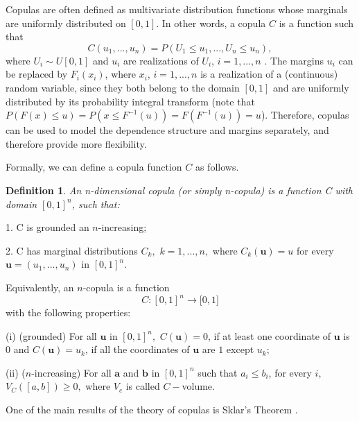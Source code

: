\documentclass[a4paper,12pt]{report}
\newtheorem{definition}{Definition}
\begin{document}
\begin{refsection}
Copulas are often defined as multivariate distribution functions whose
marginals are uniformly distributed on $[0,1]$. In other words, a copula $C$
is a function such that
\begin{equation}
C\left( u_{1},...,u_{n}\right) =P\left( U_{1}\leq u_{1},...,U_{n}\leq
u_{n}\right) ,  \label{20}
\end{equation}%
where $U_{i}\sim U[0,1]$ and $u_{i}$ are realizations of $U_{i}$, $i=1,...,n$%
. The margins $u_{i}$ can be replaced by $F_{i}\left( x_{i}\right) $, where $%
x_{i}$, $i=1,...,n$ is a realization of a (continuous) random variable,
since they both belong to the domain $[0,1]$ and are uniformly distributed
by its probability integral transform (note that $P\left( F\left( x\right)
\leq u\right) =P\left( x\leq F^{-1}\left( u\right) \right) =F\left(
F^{-1}\left( u\right) \right) =u$). Therefore, copulas can be used to model
the dependence structure and margins separately, and therefore provide more
flexibility.

\bigskip

Formally, we can define a copula function $C$ as follows. \bigskip

\begin{definition}
	An n-dimensional copula (or simply n-copula) is a function C with domain $%
	[0,1]^{n}$, such that:
\end{definition}

1. C is grounded an $n$-increasing;

2. C has marginal distributions $C_{k},$ $k=1,...,n,$ where $C_{k}(\mathbf{u}%
)=u$ for every $\mathbf{u}=\left( u_{1},...,u_{n}\right) $ in $[0,1]^{n}.$

\bigskip

Equivalently, an $n$-copula is a function
\begin{equation*}
C:[0,1]^{n}\rightarrow \lbrack 0,1]
\end{equation*}%
with the following properties:

(i) (grounded) For all $\mathbf{u}$ in $[0,1]^{n},$ $C(\mathbf{u})=0$, if at
least one coordinate of $\mathbf{u}$ is $0$ and $C(\mathbf{u})=u_{k}$, if
all the coordinates of $\mathbf{u}$ are $1$ except $u_{k};$

(ii) ($n$-increasing) For all $\mathbf{a}$ and $\mathbf{b}$ in $[0,1]^{n}$
such that $a_{i}\leq b_{i}$, for every $i,$ $V_{C}\left( \left[ a,b\right]
\right) \geq 0,$ where $V_{c}$ is called $C-$volume.

One of the main results of the theory of copulas is Sklar's Theorem \citet*{%
	sklar1959}.


\end{refsection}
\end{document}
